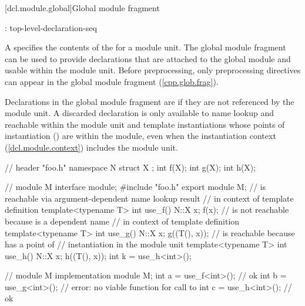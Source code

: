 [dcl.module.global]{Global module fragment}

\begin{std.txt}\color{addclr}
\begin{bnf}
:\br
     \terminal{;} top-level-declaration-seq
\end{bnf}

\resetalinea[0]
\alinea
A  specifies the contents of the
 for a module unit.
The global module fragment can be used to provide declarations
that are attached to the global module and usable within the module unit.
\enternote
Before preprocessing, only preprocessing directives can appear
in the global module fragment (\ref{cpp.glob.frag}).
\exitnote

\alinea
Declarations in the global module fragment are  if they
are not referenced by the module unit. A discarded declaration is only
available to name lookup and reachable within the module unit
and template instantiations whose points of instantiation
() are within the module,
even when the instantiation context (\ref{dcl.module.context})
includes the module unit.
\begin{example}
\begin{codeblock}
// header "foo.h"
namespace N {
  struct X {};
  int f(X);
  int g(X);
  int h(X);
}

// module M interface
module;
#include "foo.h"
export module M;
//  is reachable via argument-dependent name lookup result
// in context of template definition
template<typename T> int use_f() { N::X x; f(x); }
//  is not reachable because  is a dependent name
// in context of template definition
template<typename T> int use_g() { N::X x; g((T(), x)); }
//  is reachable because  has a point of
// instantiation in the module unit 
template<typename T> int use_h() { N::X x; h((T(), x)); }
int k = use_h<int>();

// module M implementation
module M;
int a = use_f<int>(); // ok
int b = use_g<int>(); // error: no viable function for call to 
int c = use_h<int>(); // ok
\end{codeblock}
\end{example}



\end{std.txt}
